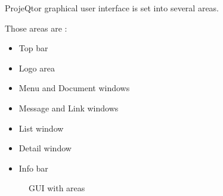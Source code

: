 \documentclass[letterpaper,10pt,english]{sphinxmanual}
\begin{document}
\begin{center}\setlength{\fboxsep}{5pt}\end{center}

ProjeQtor graphical user interface is set into several areas.

Those areas are :
\begin{itemize}
\item {} 
Top bar

\item {} 
Logo area

\item {} 
Menu and Document windows

\item {} 
Message and Link windows

\item {} 
List window

\item {} 
Detail window

\item {} 
Info bar

\end{itemize}
\begin{figure}[htbp]
\centering
\capstart

\caption{GUI with areas}\end{figure}
\end{document}
